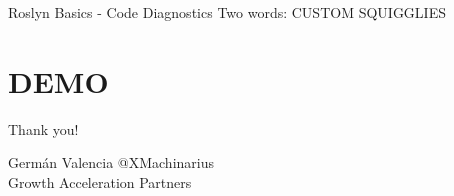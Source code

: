 \documentclass[10pt]{beamer}
\begin{document}
\begin{frame}{Roslyn Basics - Code Diagnostics}
Two words: CUSTOM SQUIGGLIES
\end{frame}

\section{DEMO}

\begin{frame}{Thank you!}
\begin{block}{Germán Valencia}
    @XMachinarius \\ Growth Acceleration Partners
\end{block}
\end{frame}

{ %
    \begin{frame}[plain]
     \end{frame}
}
\end{document}
